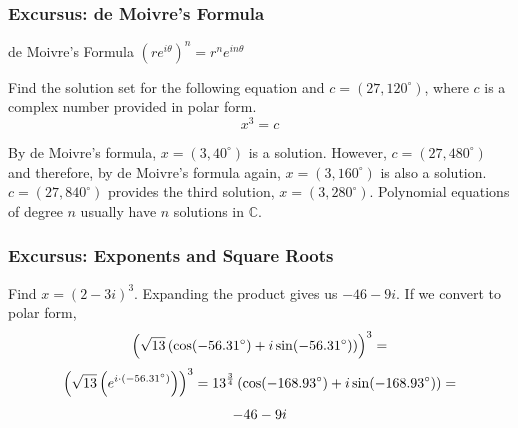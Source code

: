 \documentclass[xcolor=dvipsnames]{beamer}
\begin{document}
\begin{frame}
  \frametitle{Excursus: de Moivre's Formula}
\begin{block}{de Moivre's Formula}
  $\left(re^{i\theta}\right)^{n}=r^{n}e^{in\theta}$
\end{block}

\medskip

 Find the solution set for the following equation
and $c=(27,120^{\circ})$, where $c$ is a complex number provided in
polar form.
\begin{equation}
  \label{eq:aephacha}
  x^{3}=c
\end{equation}

\medskip

By de Moivre's formula, $x=(3,40^{\circ})$ is a solution. However,
$c=(27,480^{\circ})$ and therefore, by de Moivre's formula again,
$x=(3,160^{\circ})$ is also a solution. $c=(27,840^{\circ})$ provides
the third solution, $x=(3,280^{\circ})$. Polynomial equations of
degree $n$ usually have $n$ solutions in $\mathbb{C}$. 
\end{frame}

\begin{frame}
  \frametitle{Excursus: Exponents and Square Roots}
   Find $x=(2-3i)^{3}$. Expanding the product
  gives us $-46-9i$. If we convert to polar form,
  \begin{equation}
    \label{eq:akingahg}
    \left(\sqrt{13}\left(\cos(-56.31^{\circ})+i\sin(-56.31^{\circ})\right)\right)^{3}=\notag
  \end{equation}
  \begin{equation}
    \label{eq:ohsegeel}
    \left(\sqrt{13}\left(e^{i\cdot{}(-56.31^{\circ})}\right)\right)^{3}=13^{\frac{3}{4}}\left(\cos(-168.93^{\circ})+i\sin(-168.93^{\circ})\right)=\notag
  \end{equation}
  \begin{equation}
    \label{eq:ciesoola}
  -46-9i\notag
  \end{equation}
\end{frame}
\end{document}
